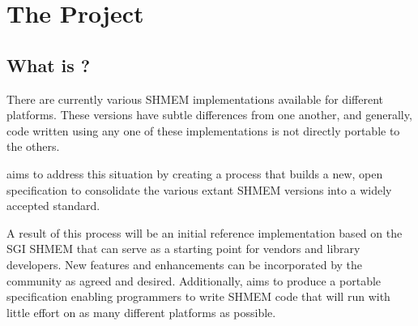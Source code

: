 
\section{The \openshmem Project}


\subsection{What is \openshmem ?}

There are currently various SHMEM implementations available for
different platforms. These versions have subtle differences from one
another, and generally, code written using any one of these
implementations is not directly portable to the others.

\openshmem aims to address this situation by creating a process that
builds a new, open specification to consolidate the various extant
SHMEM versions into a widely accepted standard.

A result of this process will be an initial reference implementation
based on the SGI SHMEM that can serve as a starting point for vendors
and library developers. New features and enhancements can be incorporated
by the community as agreed and desired. Additionally, \openshmem aims
to produce a portable specification enabling programmers to write
SHMEM code that will run with little effort on as many different platforms
as possible.
